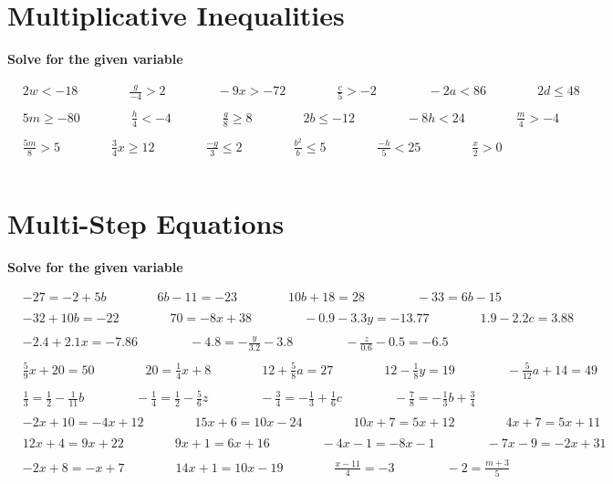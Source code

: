 \documentclass{article}
\begin{document}
\bigskip

\section{Multiplicative Inequalities}
\bigskip
\textbf{Solve for the given variable}

\bigskip

\(\begin{aligned}
	&2w<-18 \qquad\qquad \frac{g}{-4}>2 \qquad\qquad -9x>-72 \qquad\qquad \frac{c}{5}>-2 \qquad\qquad -2a<86 \qquad\qquad 2d\le48\\\\
	&5m\ge-80 \qquad\qquad \frac{h}{4}<-4 \qquad\qquad \frac{g}{8}\ge8 \qquad\qquad 2b\le-12 \qquad\qquad -8h<24 \qquad\qquad \frac{m}{4}>-4\\\\
	&\frac{5m}{8}>5 \qquad\qquad \frac{3}{4}x\ge12 \qquad\qquad \frac{-g}{3}\le2 \qquad\qquad \frac{b^2}{b}\le5 \qquad\qquad \frac{-h}{5}<25 \qquad\qquad \frac{x}{2}>0\\\\
\end{aligned}\)

\bigskip

\section{Multi-Step Equations}
\bigskip
\textbf{Solve for the given variable}

\bigskip

\(\begin{aligned}
	&-27=-2+5b \qquad\qquad 6b-11=-23 \qquad\qquad 10b+18=28 \qquad\qquad -33=6b-15\\\\
	&-32+10b=-22 \qquad\qquad 70=-8x+38 \qquad\qquad -0.9-3.3y=-13.77 \qquad\qquad 1.9-2.2c=3.88 \\\\
	&-2.4+2.1x=-7.86 \qquad\qquad -4.8=-\frac{y}{3.2}-3.8 \qquad\qquad -\frac{z}{0.6}-0.5=-6.5 \\\\
	&\frac{5}{9}x+20=50 \qquad\qquad 20=\frac{1}{4}x+8 \qquad\qquad 12+\frac{5}{8}a=27 \qquad\qquad 12-\frac{1}{8}y=19 \qquad\qquad -\frac{5}{12}a+14=49 \\\\
	&\frac{1}{3}=\frac{1}{2}-\frac{1}{11}b \qquad\qquad -\frac{1}{4}=\frac{1}{2}-\frac{5}{6}z \qquad\qquad -\frac{3}{4}=-\frac{1}{3}+\frac{1}{6}c \qquad\qquad -\frac{7}{8}=-\frac{1}{3}b+\frac{3}{4}\\\\
	&-2x+10=-4x+12 \qquad\qquad 15x+6=10x-24 \qquad\qquad 10x+7=5x+12 \qquad\qquad 4x+7=5x+11\\\\
	&12x+4=9x+22 \qquad\qquad 9x+1=6x+16 \qquad\qquad -4x-1=-8x-1 \qquad\qquad -7x-9=-2x+31 \\\\
	&-2x+8=-x+7 \qquad\qquad 14x+1=10x-19 \qquad\qquad \frac{x-11}{4}=-3 \qquad\qquad -2=\frac{m+3}{5}\\\\
\end{aligned}\)
\end{document}
